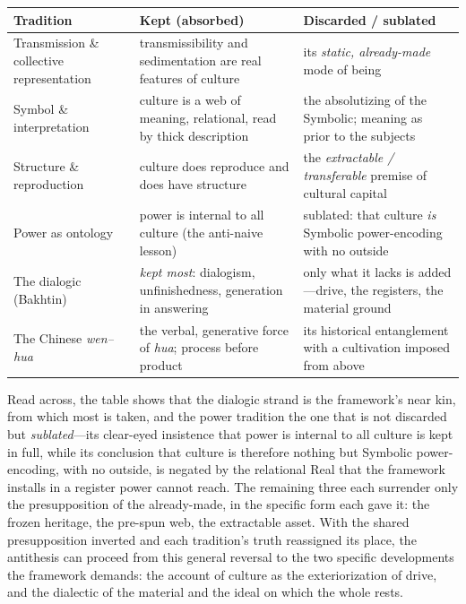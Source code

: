 \begin{center}
\small
\renewcommand{\arraystretch}{1.4}
\begin{tabularx}{\linewidth}{@{}>{\RaggedRight\arraybackslash}p{3.2cm} >{\RaggedRight\arraybackslash}X >{\RaggedRight\arraybackslash}X@{}}
\toprule
\textcolor{rosedeep}{\textbf{Tradition}} & \textcolor{rosedeep}{\textbf{Kept (absorbed)}} & \textcolor{rosedeep}{\textbf{Discarded / sublated}} \\
\midrule
Transmission \& collective representation & transmissibility and sedimentation are real features of culture & its \emph{static, already-made} mode of being \\
Symbol \& interpretation & culture is a web of meaning, relational, read by thick description & the absolutizing of the Symbolic; meaning as prior to the subjects \\
Structure \& reproduction & culture does reproduce and does have structure & the \emph{extractable / transferable} premise of cultural capital \\
Power as ontology & power is internal to all culture (the anti-naive lesson) & sublated: that culture \emph{is} Symbolic power-encoding with no outside \\
The dialogic (Bakhtin) & \emph{kept most}: dialogism, unfinishedness, generation in answering & only what it lacks is added---drive, the registers, the material ground \\
The Chinese \emph{wen--hua} & the verbal, generative force of \emph{hua}; process before product & its historical entanglement with a cultivation imposed from above \\
\bottomrule
\end{tabularx}
\end{center}

Read across, the table shows that the dialogic strand is the framework's near kin, from which most is taken, and the power tradition the one that is not discarded but \emph{sublated}---its clear-eyed insistence that power is internal to all culture is kept in full, while its conclusion that culture is therefore nothing but Symbolic power-encoding, with no outside, is negated by the relational Real that the framework installs in a register power cannot reach. The remaining three each surrender only the presupposition of the already-made, in the specific form each gave it: the frozen heritage, the pre-spun web, the extractable asset. With the shared presupposition inverted and each tradition's truth reassigned its place, the antithesis can proceed from this general reversal to the two specific developments the framework demands: the account of culture as the exteriorization of drive, and the dialectic of the material and the ideal on which the whole rests.
